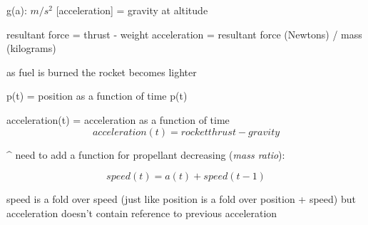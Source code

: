 \documentclass[12pt]{article}
\title{}
\author{Thomas Jakway}
\date{}
\begin{document}
\maketitle


g(a): $m/s^2$ [acceleration] = gravity at altitude

resultant force = thrust - weight
acceleration = resultant force (Newtons) / mass (kilograms)

as fuel is burned the rocket becomes lighter


p(t) = position as a function of time
p(t)

acceleration(t) = acceleration as a function of time
\[acceleration(t) = rocket thrust - gravity \]

\^{} need to add a function for propellant decreasing (\emph{mass ratio}):
    

\[speed(t) = a(t) + speed(t - 1) \]

speed is a fold over speed (just like position is a fold over position + speed)
but acceleration doesn't contain reference to previous acceleration
\end{document}
